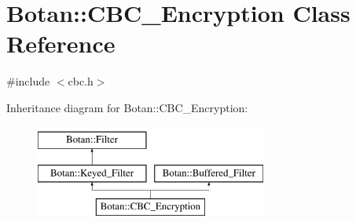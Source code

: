 \hypertarget{classBotan_1_1CBC__Encryption}{\section{Botan\-:\-:C\-B\-C\-\_\-\-Encryption Class Reference}
\label{classBotan_1_1CBC__Encryption}
}


{\ttfamily \#include $<$cbc.\-h$>$}

Inheritance diagram for Botan\-:\-:C\-B\-C\-\_\-\-Encryption\-:\begin{figure}[H]
\begin{center}
\leavevmode
\includegraphics[height=3.000000cm]{classBotan_1_1CBC__Encryption}
\end{center}
\end{figure}
